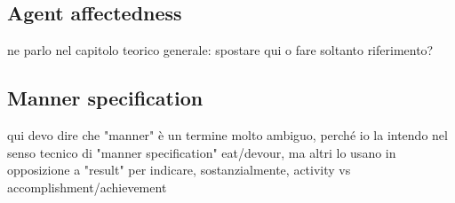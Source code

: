 



\subsection{Agent affectedness} 

ne parlo nel capitolo teorico generale: spostare qui o fare soltanto riferimento?

\subsection{Manner specification} 

qui devo dire che "manner" è un termine molto ambiguo, perché io la intendo nel senso tecnico di "manner specification" eat/devour, ma altri lo usano in opposizione a "result" per indicare, sostanzialmente, activity vs accomplishment/achievement



